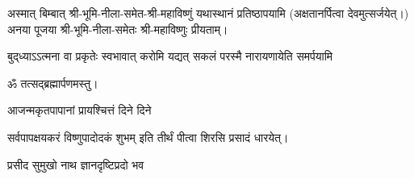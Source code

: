 \begin{center}
अस्मात् बिम्बात् श्री-भूमि-नीला-समेत-श्री-महाविष्णुं यथास्थानं प्रतिष्ठापयामि (अक्षतानर्पित्वा देवमुत्सर्जयेत्।)\\
अनया पूजया श्री-भूमि-नीला-समेतः श्री-महाविष्णुः प्रीयताम्।\medskip

{बुद्‌ध्याऽऽत्मना वा प्रकृतेः स्वभावात्}
{करोमि यद्यत् सकलं परस्मै}
{नारायणायेति समर्पयामि}


ॐ तत्सद्ब्रह्मार्पणमस्तु।\medskip

{आजन्मकृतपापानां प्रायश्चित्तं दिने दिने}

{सर्वपापक्षयकरं विष्णुपादोदकं शुभम्}
इति तीर्थं पीत्वा शिरसि प्रसादं धारयेत्।

\end{center}


{प्रसीद सुमुखो नाथ ज्ञानदृष्टिप्रदो भव}

\hyperref[sec:start_ekadashi_puja]{\closesection}

\clearpage

